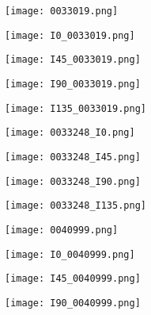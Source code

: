 \begin{figure}
\begin{subfigure}{.11\textwidth}
	\end{subfigure}%
	\begin{subfigure}{.105\textwidth}
		\centering
		\texttt{[image: 0033019.png]}
	\end{subfigure}%
	\begin{subfigure}{.105\textwidth}
		\centering
		\texttt{[image: I0\_0033019.png]}
	\end{subfigure}%
	\begin{subfigure}{.105\textwidth}
		\centering
		\texttt{[image: I45\_0033019.png]}
	\end{subfigure}%
	\begin{subfigure}{.105\textwidth}
		\centering
		\texttt{[image: I90\_0033019.png]}
	\end{subfigure}%
	\begin{subfigure}{.105\textwidth}
		\centering
		\texttt{[image: I135\_0033019.png]}
	\end{subfigure}
	\begin{subfigure}{.11\textwidth}
		\centering
		\texttt{[image: 0033248\_I0.png]}
	\end{subfigure}%
	\begin{subfigure}{.11\textwidth}
		\centering
		\texttt{[image: 0033248\_I45.png]}
	\end{subfigure}%
	\begin{subfigure}{.11\textwidth}
		\centering
		\texttt{[image: 0033248\_I90.png]}
	\end{subfigure}%
	\begin{subfigure}{.11\textwidth}
		\centering
		\texttt{[image: 0033248\_I135.png]}
	\end{subfigure}%
	\begin{subfigure}{.105\textwidth}
		\centering
		\texttt{[image: 0040999.png]}
	\end{subfigure}%
	\begin{subfigure}{.105\textwidth}
		\centering
		\texttt{[image: I0\_0040999.png]}
	\end{subfigure}%
	\begin{subfigure}{.105\textwidth}
		\centering
		\texttt{[image: I45\_0040999.png]}
	\end{subfigure}%
	\begin{subfigure}{.105\textwidth}
		\centering
		\texttt{[image: I90\_0040999.png]}
	\end{subfigure}%

\end{figure}
